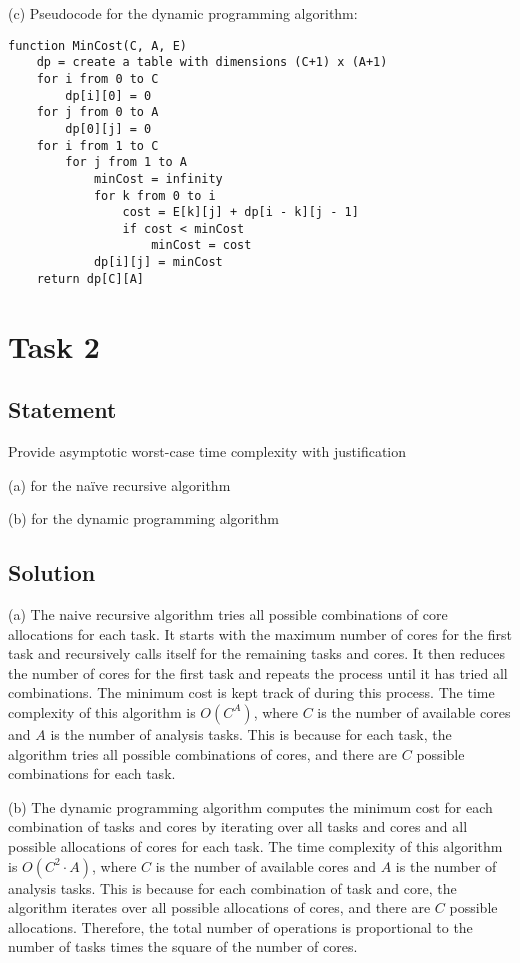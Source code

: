 \documentclass{article}
\begin{document}
(c) Pseudocode for the dynamic programming algorithm:

\begin{verbatim}
function MinCost(C, A, E)
    dp = create a table with dimensions (C+1) x (A+1)
    for i from 0 to C
        dp[i][0] = 0
    for j from 0 to A
        dp[0][j] = 0
    for i from 1 to C
        for j from 1 to A
            minCost = infinity
            for k from 0 to i
                cost = E[k][j] + dp[i - k][j - 1]
                if cost < minCost
                    minCost = cost
            dp[i][j] = minCost
    return dp[C][A]
\end{verbatim}

\section{Task 2}
\subsection{Statement}
Provide asymptotic worst-case time complexity with justification

(a) for the naïve recursive algorithm

(b) for the dynamic programming algorithm

\subsection{Solution}

(a) The naive recursive algorithm tries all possible combinations of core allocations for each task. It starts with the maximum number of cores for the first task and recursively calls itself for the remaining tasks and cores. It then reduces the number of cores for the first task and repeats the process until it has tried all combinations. The minimum cost is kept track of during this process. The time complexity of this algorithm is $O(C^A)$, where $C$ is the number of available cores and $A$ is the number of analysis tasks. This is because for each task, the algorithm tries all possible combinations of cores, and there are $C$ possible combinations for each task.

(b) The dynamic programming algorithm computes the minimum cost for each combination of tasks and cores by iterating over all tasks and cores and all possible allocations of cores for each task. The time complexity of this algorithm is $O(C^2 \cdot A)$, where $C$ is the number of available cores and $A$ is the number of analysis tasks. This is because for each combination of task and core, the algorithm iterates over all possible allocations of cores, and there are $C$ possible allocations. Therefore, the total number of operations is proportional to the number of tasks times the square of the number of cores.
\end{document}
